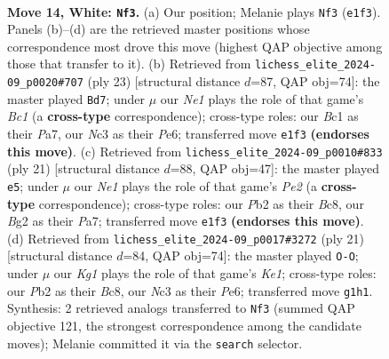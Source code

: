 \documentclass[11pt]{article}
\begin{document}
\clearpage

\begin{figure}[p]\centering
\begin{subfigure}{0.46\textwidth}\centering
\resizebox{\linewidth}{!}{%
\newchessgame
\chessboard[
  setfen={r1bqnrk1/pp1pppbp/8/2p5/2P3Q1/2N5/PP1P1PBP/R1B1NRK1 w - - 1 14},
  showmover=false,
  pgfstyle=straightmove, color=movearrow, markmove={e1-f3}
]}
\caption{}
\end{subfigure}\hfill
\begin{subfigure}{0.46\textwidth}\centering
\resizebox{\linewidth}{!}{%
\newchessgame
\chessboard[
  setfen={r1b2rk1/pp2bppp/3qpn2/8/3N4/1BP5/PP3PPP/R1BQ1RK1 b - - 2 12},
  showmover=false,
  pgfstyle=straightmove, color=movearrow, markmove={c8-d7}
]}
\caption{}
\end{subfigure}
\\[4pt]
\begin{subfigure}{0.46\textwidth}\centering
\resizebox{\linewidth}{!}{%
\newchessgame
\chessboard[
  setfen={r1b2rk1/pp2ppbp/2n3p1/2q5/8/3B1N1P/PPP1QPP1/R1B2RK1 b - - 3 11},
  showmover=false,
  pgfstyle=straightmove, color=movearrow, markmove={e7-e5}
]}
\caption{}
\end{subfigure}\hfill
\begin{subfigure}{0.46\textwidth}\centering
\resizebox{\linewidth}{!}{%
\newchessgame
\chessboard[
  setfen={r1b1k2r/pp2bppp/3qpn2/8/3N4/1B6/PPP2PPP/R1BQ1RK1 b kq - 2 11},
  showmover=false,
  pgfstyle=straightmove, color=movearrow, markmove={e8-g8}
]}
\caption{}
\end{subfigure}
\caption{\textbf{Move 14, White: \texttt{Nf3}.} (a) Our position; Melanie plays \texttt{Nf3} (\texttt{e1f3}). Panels (b)--(d) are the retrieved master positions whose correspondence most drove this move (highest QAP objective among those that transfer to it). (b) Retrieved from \texttt{lichess\_elite\_2024-09\_p0020\#707} (ply 23) [structural distance $d$=87, QAP obj=74]: the master played \texttt{Bd7}; under $\mu$ our \emph{Ne1} plays the role of that game's \emph{Bc1} (a \textbf{cross-type} correspondence); cross-type roles: our \emph{B}c1 as their \emph{P}a7, our \emph{N}c3 as their \emph{P}e6; transferred move \texttt{e1f3} \textbf{(endorses this move)}. (c) Retrieved from \texttt{lichess\_elite\_2024-09\_p0010\#833} (ply 21) [structural distance $d$=88, QAP obj=47]: the master played \texttt{e5}; under $\mu$ our \emph{Ne1} plays the role of that game's \emph{Pe2} (a \textbf{cross-type} correspondence); cross-type roles: our \emph{P}b2 as their \emph{B}c8, our \emph{B}g2 as their \emph{P}a7; transferred move \texttt{e1f3} \textbf{(endorses this move)}. (d) Retrieved from \texttt{lichess\_elite\_2024-09\_p0017\#3272} (ply 21) [structural distance $d$=84, QAP obj=74]: the master played \texttt{O-O}; under $\mu$ our \emph{Kg1} plays the role of that game's \emph{Ke1}; cross-type roles: our \emph{P}b2 as their \emph{B}c8, our \emph{N}c3 as their \emph{P}e6; transferred move \texttt{g1h1}. Synthesis: 2 retrieved analogs transferred to \texttt{Nf3} (summed QAP objective 121, the strongest correspondence among the candidate moves); Melanie committed it via the \texttt{search} selector.}
\label{fig:thought-m26}
\end{figure}
\end{document}
